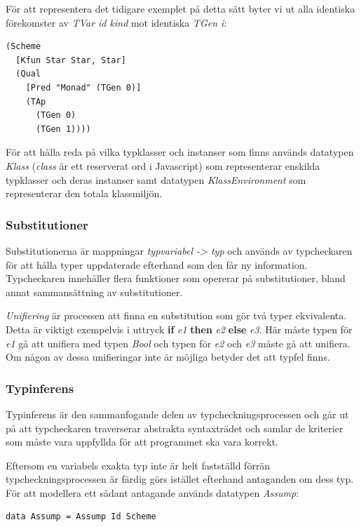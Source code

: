 För att representera det tidigare exemplet på detta sätt byter vi ut alla identiska förekomster av \emph{TVar id kind} mot identiska \emph{TGen i}:
\begin{lstlisting}
(Scheme
  [Kfun Star Star, Star]
  (Qual
    [Pred "Monad" (TGen 0)]
    (TAp
      (TGen 0)
      (TGen 1))))
\end{lstlisting}

För att hålla reda på vilka typklasser och instanser som finns används datatypen \emph{Klass} (\emph{class} är ett reserverat ord i Javascript) som representerar enskilda typklasser och deras instanser samt datatypen \emph{KlassEnvironment} som representerar den totala klassmiljön.

\subsubsection{Substitutioner}
Substitutionerna är mappningar \emph{typvariabel -> typ} och används av typcheckaren
för att hålla typer uppdaterade efterhand som den får ny
information. Typcheckaren innehåller flera funktioner som opererar på
substitutioner, bland annat sammansättning av substitutioner.  %

\emph{Unifiering} är processen att finna en substitution som gör två typer ekvivalenta. Detta är viktigt exempelvis i uttryck {\bf if} \emph{e1} {\bf then} \emph{e2} {\bf else} \emph{e3}. Här måste typen för \emph{e1} gå att unifiera med typen \emph{Bool} och typen för \emph{e2} och \emph{e3} måste gå att unifiera. Om någon av dessa unifieringar inte är möjliga betyder det att typfel finns.

\subsubsection{Typinferens}
Typinferens är den sammanfogande delen av typcheckningsprocessen och går ut på att typcheckaren traverserar abstrakta syntaxträdet och samlar de kriterier som måste vara uppfyllda för att programmet ska vara korrekt.

Eftersom en variabels exakta typ inte är helt fastställd förrän typcheckningsprocessen är färdig görs istället efterhand antaganden om dess typ. För att modellera ett sådant antagande används datatypen \emph{Assump}:
\begin{lstlisting}
data Assump = Assump Id Scheme
\end{lstlisting}

